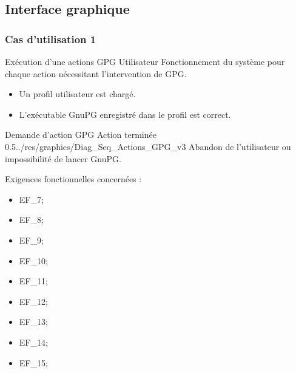 \documentclass{../res/univ-projet}
\begin{document}
\subsection{Interface graphique}

\subsubsection{Cas d'utilisation 1}
\ficheGraphic
{Exécution d'une actions GPG}
{Utilisateur}
{
  Fonctionnement du système pour chaque action nécessitant l'intervention de GPG.
}
{
 \begin{itemize}
  \item Un profil utilisateur est chargé.
  \item L'exécutable GnuPG enregistré dans le profil est correct.
 \end{itemize}

}
{Demande d'action GPG}
{Action terminée}
{0.5}{../res/graphics/Diag_Seq_Actions_GPG_v3}
{Abandon de l'utilisateur ou impossibilité de lancer GnuPG.}
\vspace{0.5cm}

Exigences fonctionnelles concernées :
\begin{itemize}
 \item EF\_7;
 \item EF\_8;
 \item EF\_9;
 \item EF\_10;
 \item EF\_11;
 \item EF\_12;
 \item EF\_13;
 \item EF\_14;
 \item EF\_15;
\end{itemize}
\end{document}
